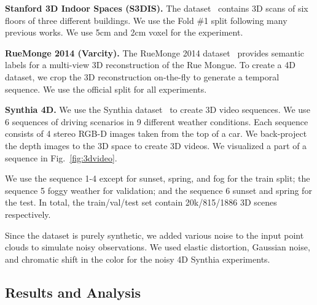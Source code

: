\textbf{Stanford 3D Indoor Spaces (S3DIS).}
The dataset~\cite{stanford3dis} contains 3D scans of six floors of three different buildings. We use the Fold \#1 split following many previous works. We use 5cm and 2cm voxel for the experiment.

\textbf{RueMonge 2014 (Varcity).} The RueMonge 2014 dataset~\cite{ruemonge2014} provides semantic labels for a multi-view 3D reconstruction of the Rue Mongue. To create a 4D dataset, we crop the 3D reconstruction on-the-fly to generate a temporal sequence. We use the official split for all experiments.

\textbf{Synthia 4D.} We use the Synthia dataset~\cite{synthia} to create 3D video sequences. We use 6 sequences of driving scenarios in 9 different weather conditions. Each sequence consists of 4 stereo RGB-D images taken from the top of a car. We back-project the depth images to the 3D space to create 3D videos. We visualized a part of a sequence in Fig.~\ref{fig:3dvideo}.

We use the sequence 1-4 except for sunset, spring, and fog for the train split; the sequence 5 foggy weather for validation; and the sequence 6 sunset and spring for the test. In total, the train/val/test set contain 20k/815/1886 3D scenes respectively.

Since the dataset is purely synthetic, we added various noise to the input point clouds to simulate noisy observations. We used elastic distortion, Gaussian noise, and chromatic shift in the color for the noisy 4D Synthia experiments.


\subsection{Results and Analysis}

